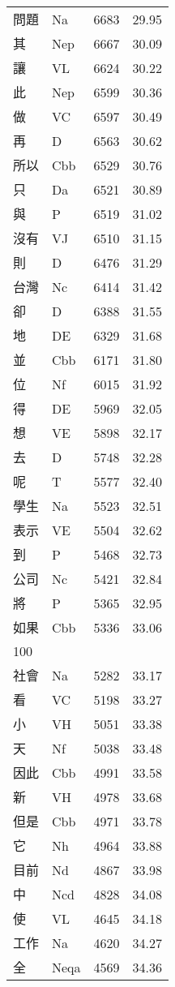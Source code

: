 \documentclass[twocolumn]{book}
\begin{document}
\begin{supertabular}{llrr}
問題 & Na & 6683 &  29.95\\
其 & Nep & 6667 &  30.09\\
讓 & VL & 6624 &  30.22\\
此 & Nep & 6599 &  30.36\\
做 & VC & 6597 &  30.49\\
再 & D & 6563 &  30.62\\
所以 & Cbb & 6529 &  30.76\\
只 & Da & 6521 &  30.89\\
與 & P & 6519 &  31.02\\
沒有 & VJ & 6510 &  31.15\\
則 & D & 6476 &  31.29\\
台灣 & Nc & 6414 &  31.42\\
卻 & D & 6388 &  31.55\\
地 & DE & 6329 &  31.68\\
並 & Cbb & 6171 &  31.80\\
位 & Nf & 6015 &  31.92\\
得 & DE & 5969 &  32.05\\
想 & VE & 5898 &  32.17\\
去 & D & 5748 &  32.28\\
呢 & T & 5577 &  32.40\\
學生 & Na & 5523 &  32.51\\
表示 & VE & 5504 &  32.62\\
到 & P & 5468 &  32.73\\
公司 & Nc & 5421 &  32.84\\
將 & P & 5365 &  32.95\\
如果 & Cbb & 5336 &  33.06\\
100\\
社會 & Na & 5282 &  33.17\\
看 & VC & 5198 &  33.27\\
小 & VH & 5051 &  33.38\\
天 & Nf & 5038 &  33.48\\
因此 & Cbb & 4991 &  33.58\\
新 & VH & 4978 &  33.68\\
但是 & Cbb & 4971 &  33.78\\
它 & Nh & 4964 &  33.88\\
目前 & Nd & 4867 &  33.98\\
中 & Ncd & 4828 &  34.08\\
使 & VL & 4645 &  34.18\\
工作 & Na & 4620 &  34.27\\
全 & Neqa & 4569 &  34.36\\

\end{supertabular}
\end{document}
